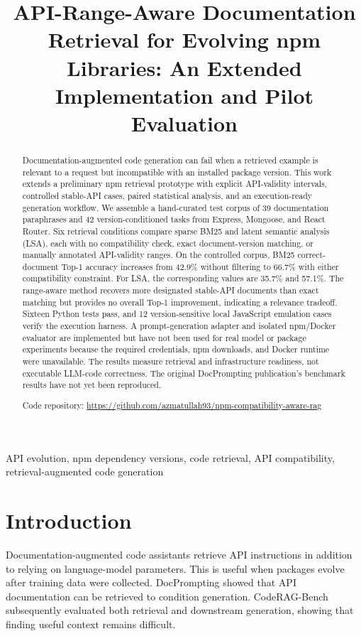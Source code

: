 \documentclass[conference]{IEEEtran}
\title{API-Range-Aware Documentation Retrieval for Evolving npm Libraries: An Extended Implementation and Pilot Evaluation}
\author{\IEEEauthorblockN{Azmat Ullah}
\IEEEauthorblockA{Department of Computer Science, FAST-NUCES, Islamabad, Pakistan\\
Registration No.: 26i-7841\\
\texttt{\detokenize{i267841@isb.nu.edu.pk}}}}
\begin{document}
\maketitle
\begin{abstract}
Documentation-augmented code generation can fail when a retrieved example is relevant to a request but incompatible with an installed package version. This work extends a preliminary npm retrieval prototype with explicit API-validity intervals, controlled stable-API cases, paired statistical analysis, and an execution-ready generation workflow. We assemble a hand-curated test corpus of 39 documentation paraphrases and 42 version-conditioned tasks from Express, Mongoose, and React Router. Six retrieval conditions compare sparse BM25 and latent semantic analysis (LSA), each with no compatibility check, exact document-version matching, or manually annotated API-validity ranges. On the controlled corpus, BM25 correct-document Top-1 accuracy increases from 42.9\% without filtering to 66.7\% with either compatibility constraint. For LSA, the corresponding values are 35.7\% and 57.1\%. The range-aware method recovers more designated stable-API documents than exact matching but provides no overall Top-1 improvement, indicating a relevance tradeoff. Sixteen Python tests pass, and 12 version-sensitive local JavaScript emulation cases verify the execution harness. A prompt-generation adapter and isolated npm/Docker evaluator are implemented but have not been used for real model or package experiments because the required credentials, npm downloads, and Docker runtime were unavailable. The results measure retrieval and infrastructure readiness, not executable LLM-code correctness. The original DocPrompting publication's benchmark results have not yet been reproduced.
\par\noindent Code repository: \url{https://github.com/azmatullah93/npm-compatibility-aware-rag}
\end{abstract}
\begin{IEEEkeywords}
API evolution, npm dependency versions, code retrieval, API compatibility, retrieval-augmented code generation
\end{IEEEkeywords}

\section{Introduction}
Documentation-augmented code assistants retrieve API instructions in addition to relying on language-model parameters. This is useful when packages evolve after training data were collected. DocPrompting \cite{docprompting} showed that API documentation can be retrieved to condition generation. CodeRAG-Bench \cite{coderag} subsequently evaluated both retrieval and downstream generation, showing that finding useful context remains difficult.
\end{document}

